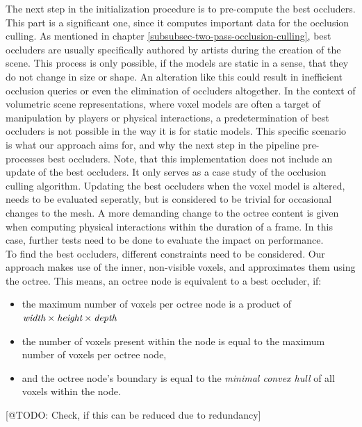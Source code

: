 The next step in the initialization procedure is to pre-compute the best occluders. This part is a significant one, 
since it computes important data for the occlusion culling. As mentioned in chapter \ref{subsubsec-two-pass-occlusion-culling},
best occluders are usually specifically authored by artists during the creation of the scene. This process is only 
possible, if the models are static in a sense, that they do not change in size or shape. An alteration like this 
could result in inefficient occlusion queries or even the elimination of occluders altogether. In the context of 
volumetric scene representations, where voxel models are often a target of manipulation by players or physical 
interactions, a predetermination of best occluders is not possible in the way it is for static models.
This specific scenario is what our approach aims for, and why the next step in the pipeline pre-processes best 
occluders. Note, that this implementation does not include an update of the best occluders. It only serves as a 
case study of the occlusion culling algorithm. Updating the best occluders when the voxel model is altered, 
needs to be evaluated seperatly, but is considered to be trivial for occasional changes to the mesh. A more 
demanding change to the octree content is given when computing physical interactions within the duration of a frame.
In this case, further tests need to be done to evaluate the impact on performance. \\

\noindent
To find the best occluders, different constraints need to be considered. Our approach makes use of the inner, non-visible 
voxels, and approximates them using the octree. This means, an octree node is equivalent to a best occluder, if:

\begin{itemize}
    \item the maximum number of voxels per octree node is a product of \begin{math}\emph{width} \times \emph{height} \times \emph{depth}\end{math}
    \item the number of voxels present within the node is equal to the maximum number of voxels per octree node,
    \item and the octree node's boundary is equal to the \emph{minimal convex hull} of all voxels within the node.
\end{itemize}

[@TODO: Check, if this can be reduced due to redundancy]

